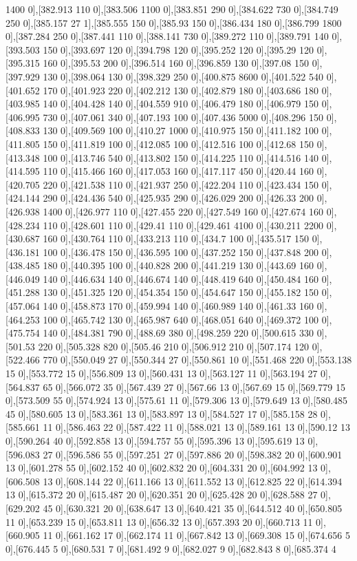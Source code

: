 {1400 0],[382.913 110 0],[383.506 1100 0],[383.851 290 0],[384.622 730 0],[384.749 250 0],[385.157 27 1],[385.555 150 0],[385.93 150 0],[386.434 180 0],[386.799 1800 0],[387.284 250 0],[387.441 110 0],[388.141 730 0],[389.272 110 0],[389.791 140 0],[393.503 150 0],[393.697 120 0],[394.798 120 0],[395.252 120 0],[395.29 120 0],[395.315 160 0],[395.53 200 0],[396.514 160 0],[396.859 130 0],[397.08 150 0],[397.929 130 0],[398.064 130 0],[398.329 250 0],[400.875 8600 0],[401.522 540 0],[401.652 170 0],[401.923 220 0],[402.212 130 0],[402.879 180 0],[403.686 180 0],[403.985 140 0],[404.428 140 0],[404.559 910 0],[406.479 180 0],[406.979 150 0],[406.995 730 0],[407.061 340 0],[407.193 100 0],[407.436 5000 0],[408.296 150 0],[408.833 130 0],[409.569 100 0],[410.27 1000 0],[410.975 150 0],[411.182 100 0],[411.805 150 0],[411.819 100 0],[412.085 100 0],[412.516 100 0],[412.68 150 0],[413.348 100 0],[413.746 540 0],[413.802 150 0],[414.225 110 0],[414.516 140 0],[414.595 110 0],[415.466 160 0],[417.053 160 0],[417.117 450 0],[420.44 160 0],[420.705 220 0],[421.538 110 0],[421.937 250 0],[422.204 110 0],[423.434 150 0],[424.144 290 0],[424.436 540 0],[425.935 290 0],[426.029 200 0],[426.33 200 0],[426.938 1400 0],[426.977 110 0],[427.455 220 0],[427.549 160 0],[427.674 160 0],[428.234 110 0],[428.601 110 0],[429.41 110 0],[429.461 4100 0],[430.211 2200 0],[430.687 160 0],[430.764 110 0],[433.213 110 0],[434.7 100 0],[435.517 150 0],[436.181 100 0],[436.478 150 0],[436.595 100 0],[437.252 150 0],[437.848 200 0],[438.485 180 0],[440.395 100 0],[440.828 200 0],[441.219 130 0],[443.69 160 0],[446.049 140 0],[446.634 140 0],[446.674 140 0],[448.419 640 0],[450.484 160 0],[451.288 130 0],[451.325 120 0],[454.354 150 0],[454.647 150 0],[455.182 150 0],[457.064 140 0],[458.873 170 0],[459.994 140 0],[460.989 140 0],[461.33 160 0],[464.253 100 0],[465.742 130 0],[465.987 640 0],[468.051 640 0],[469.372 100 0],[475.754 140 0],[484.381 790 0],[488.69 380 0],[498.259 220 0],[500.615 330 0],[501.53 220 0],[505.328 820 0],[505.46 210 0],[506.912 210 0],[507.174 120 0],[522.466 770 0],[550.049 27 0],[550.344 27 0],[550.861 10 0],[551.468 220 0],[553.138 15 0],[553.772 15 0],[556.809 13 0],[560.431 13 0],[563.127 11 0],[563.194 27 0],[564.837 65 0],[566.072 35 0],[567.439 27 0],[567.66 13 0],[567.69 15 0],[569.779 15 0],[573.509 55 0],[574.924 13 0],[575.61 11 0],[579.306 13 0],[579.649 13 0],[580.485 45 0],[580.605 13 0],[583.361 13 0],[583.897 13 0],[584.527 17 0],[585.158 28 0],[585.661 11 0],[586.463 22 0],[587.422 11 0],[588.021 13 0],[589.161 13 0],[590.12 13 0],[590.264 40 0],[592.858 13 0],[594.757 55 0],[595.396 13 0],[595.619 13 0],[596.083 27 0],[596.586 55 0],[597.251 27 0],[597.886 20 0],[598.382 20 0],[600.901 13 0],[601.278 55 0],[602.152 40 0],[602.832 20 0],[604.331 20 0],[604.992 13 0],[606.508 13 0],[608.144 22 0],[611.166 13 0],[611.552 13 0],[612.825 22 0],[614.394 13 0],[615.372 20 0],[615.487 20 0],[620.351 20 0],[625.428 20 0],[628.588 27 0],[629.202 45 0],[630.321 20 0],[638.647 13 0],[640.421 35 0],[644.512 40 0],[650.805 11 0],[653.239 15 0],[653.811 13 0],[656.32 13 0],[657.393 20 0],[660.713 11 0],[660.905 11 0],[661.162 17 0],[662.174 11 0],[667.842 13 0],[669.308 15 0],[674.656 5 0],[676.445 5 0],[680.531 7 0],[681.492 9 0],[682.027 9 0],[682.843 8 0],[685.374 4 }
